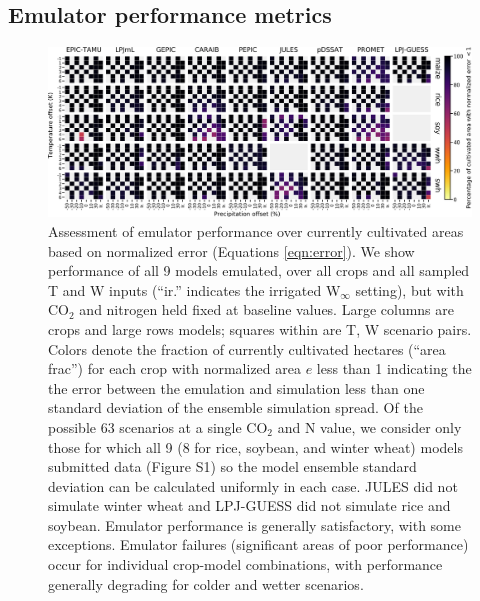 \documentclass[gmdd]{copernicus} %
\begin{document}
\subsection{Emulator performance metrics}
\label{S:4.2}
\begin{figure}[ht]
\centering
    \includegraphics[width=16.3cm]{figures/error_grid_new.png}
    \caption{
    Assessment of emulator performance over currently cultivated areas based on normalized error (Equations \ref{eqn:error}). 
    We show performance of all 9 models emulated, over all crops and all sampled T and W inputs (``ir.'' indicates the irrigated W$_{\infty}$ setting), but with CO$_2$ and nitrogen held fixed at baseline values. 
    Large columns are crops and large rows models; squares within are T, W scenario pairs. 
    Colors denote the fraction of currently cultivated hectares (``area frac'') for each crop with normalized area $e$ less than 1 indicating the the error between the emulation and simulation less than one standard deviation of the ensemble simulation spread. 
    Of the possible 63 scenarios at a single CO$_2$ and N value, we consider only those for which all 9 (8 for rice, soybean, and winter wheat) models submitted data (Figure S1) so the model ensemble standard deviation can be calculated uniformly in each case. 
    JULES did not simulate winter wheat and LPJ-GUESS did not simulate rice and soybean. Emulator performance is generally satisfactory, with some exceptions. 
    Emulator failures (significant areas of poor performance) occur for individual crop-model combinations, with performance generally degrading for colder and wetter scenarios.
    }
   \label{fig:error_360}
\end{figure}
\end{document}
